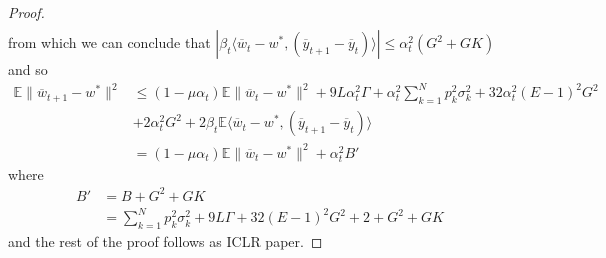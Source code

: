\begin{proof}
\begin{align*}
\end{align*}
 from which we can conclude that $|\beta_{t}\langle\overline{w}_{t}-w^{\ast},(\overline{y}_{t+1}-\overline{y}_{t})\rangle|\leq\alpha_{t}^{2}(G^{2}+GK)$
and so 
\begin{align*}
\mathbb{E}\|\overline{w}_{t+1}-w^{\ast}\|^{2} & \leq(1-\mu\alpha_{t})\mathbb{E}\|\overline{w}_{t}-w^{\ast}\|^{2}+9L\alpha_{t}^{2}\Gamma+\alpha_{t}^{2}\sum_{k=1}^{N}p_{k}^{2}\sigma_{k}^{2}+32\alpha_{t}^{2}(E-1)^{2}G^{2}\\
 & +2\alpha_{t}^{2}G^{2}+2\beta_{t}\mathbb{E}\langle\overline{w}_{t}-w^{\ast},(\overline{y}_{t+1}-\overline{y}_{t})\rangle\\
 & =(1-\mu\alpha_{t})\mathbb{E}\|\overline{w}_{t}-w^{\ast}\|^{2}+\alpha_{t}^{2}B'
\end{align*}
 where 
\begin{align*}
B' & =B+G^{2}+GK\\
 & =\sum_{k=1}^{N}p_{k}^{2}\sigma_{k}^{2}+9L\Gamma+32(E-1)^{2}G^{2}+2+G^{2}+GK
\end{align*}
 and the rest of the proof follows as ICLR paper. 
\end{proof}

